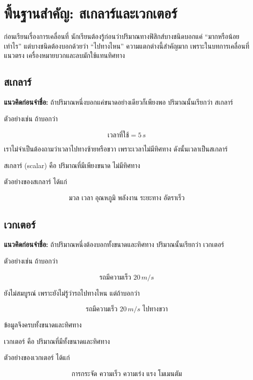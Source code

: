 \documentclass[12pt,a4paper]{report}
\begin{document}
\section{พื้นฐานสำคัญ: สเกลาร์และเวกเตอร์}

ก่อนเรียนเรื่องการเคลื่อนที่ นักเรียนต้องรู้ก่อนว่าปริมาณทางฟิสิกส์บางชนิดบอกแค่ ``มากหรือน้อยเท่าไร'' แต่บางชนิดต้องบอกด้วยว่า ``ไปทางไหน'' ความแตกต่างนี้สำคัญมาก เพราะในบทการเคลื่อนที่แนวตรง เครื่องหมายบวกและลบมักใช้แทนทิศทาง

\subsection{สเกลาร์}

\textbf{แนวคิดก่อนจำชื่อ:} ถ้าปริมาณหนึ่งบอกแค่ขนาดอย่างเดียวก็เพียงพอ ปริมาณนั้นเรียกว่า สเกลาร์

ตัวอย่างเช่น ถ้าบอกว่า

\[
\text{เวลาที่ใช้} = 5\,\si{s}
\]

เราไม่จำเป็นต้องถามว่าเวลาไปทางซ้ายหรือขวา เพราะเวลาไม่มีทิศทาง ดังนั้นเวลาเป็นสเกลาร์

\begin{tcolorbox}[title=นิยาม]
สเกลาร์ (scalar) คือ ปริมาณที่มีเพียงขนาด ไม่มีทิศทาง
\end{tcolorbox}

ตัวอย่างของสเกลาร์ ได้แก่

\[
\text{มวล เวลา อุณหภูมิ พลังงาน ระยะทาง อัตราเร็ว}
\]

\subsection{เวกเตอร์}

\textbf{แนวคิดก่อนจำชื่อ:} ถ้าปริมาณหนึ่งต้องบอกทั้งขนาดและทิศทาง ปริมาณนั้นเรียกว่า เวกเตอร์

ตัวอย่างเช่น ถ้าบอกว่า

\[
\text{รถมีความเร็ว } 20\,\si{m/s}
\]

ยังไม่สมบูรณ์ เพราะยังไม่รู้ว่ารถไปทางไหน แต่ถ้าบอกว่า

\[
\text{รถมีความเร็ว } 20\,\si{m/s} \text{ ไปทางขวา}
\]

ข้อมูลจึงครบทั้งขนาดและทิศทาง

\begin{tcolorbox}[title=นิยาม]
เวกเตอร์ คือ ปริมาณที่มีทั้งขนาดและทิศทาง
\end{tcolorbox}

ตัวอย่างของเวกเตอร์ ได้แก่

\[
\text{การกระจัด ความเร็ว ความเร่ง แรง โมเมนตัม}
\]
\end{document}
